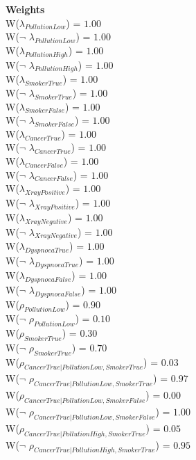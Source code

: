 \textbf{Weights}\\
W($\lambda_{PollutionLow}$) = $1.00$\\ 
W($\neg$ $\lambda_{PollutionLow}$) = $1.00$\\ 
W($\lambda_{PollutionHigh}$) = $1.00$\\ 
W($\neg$ $\lambda_{PollutionHigh}$) = $1.00$\\ 
W($\lambda_{SmokerTrue}$) = $1.00$\\ 
W($\neg$ $\lambda_{SmokerTrue}$) = $1.00$\\ 
W($\lambda_{SmokerFalse}$) = $1.00$\\ 
W($\neg$ $\lambda_{SmokerFalse}$) = $1.00$\\ 
W($\lambda_{CancerTrue}$) = $1.00$\\ 
W($\neg$ $\lambda_{CancerTrue}$) = $1.00$\\ 
W($\lambda_{CancerFalse}$) = $1.00$\\ 
W($\neg$ $\lambda_{CancerFalse}$) = $1.00$\\ 
W($\lambda_{XrayPositive}$) = $1.00$\\ 
W($\neg$ $\lambda_{XrayPositive}$) = $1.00$\\ 
W($\lambda_{XrayNegative}$) = $1.00$\\ 
W($\neg$ $\lambda_{XrayNegative}$) = $1.00$\\ 
W($\lambda_{DyspnoeaTrue}$) = $1.00$\\ 
W($\neg$ $\lambda_{DyspnoeaTrue}$) = $1.00$\\ 
W($\lambda_{DyspnoeaFalse}$) = $1.00$\\ 
W($\neg$ $\lambda_{DyspnoeaFalse}$) = $1.00$\\ 
W($\rho_{PollutionLow}$) = $0.90$\\ 
W($\neg$ $\rho_{PollutionLow}$) = $0.10$\\ 
W($\rho_{SmokerTrue}$) = $0.30$\\ 
W($\neg$ $\rho_{SmokerTrue}$) = $0.70$\\ 
W($\rho_{CancerTrue|PollutionLow,SmokerTrue}$) = $0.03$\\ 
W($\neg$ $\rho_{CancerTrue|PollutionLow,SmokerTrue}$) = $0.97$\\ 
W($\rho_{CancerTrue|PollutionLow,SmokerFalse}$) = $0.00$\\ 
W($\neg$ $\rho_{CancerTrue|PollutionLow,SmokerFalse}$) = $1.00$\\ 
W($\rho_{CancerTrue|PollutionHigh,SmokerTrue}$) = $0.05$\\ 
W($\neg$ $\rho_{CancerTrue|PollutionHigh,SmokerTrue}$) = $0.95$\\ 
